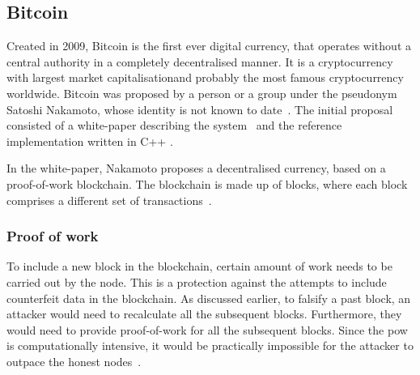 \subsection{Bitcoin}
% 
Created in 2009, Bitcoin is the first ever digital currency, that operates without a central authority in a completely decentralised manner. It is a cryptocurrency with largest market capitalisation\footnotemark and probably the most famous cryptocurrency worldwide.
% 
% 
Bitcoin was proposed by a person or a group under the pseudonym Satoshi Nakamoto, whose identity is not known to date~\cite{Feins2017SatoshiBitcoin}. The initial proposal consisted of a white-paper describing the system~\cite{NakamotoBitcoin:System} and the reference implementation written in  C++ \footnotemark.
% 

In the white-paper, Nakamoto proposes a decentralised currency, based on a proof-of-work blockchain. The blockchain is made up of blocks, where each block comprises a different set of transactions~\cite{Decker2013InformationNetwork, Judmayer2017BlocksMechanisms}.

\subsubsection{Proof of work}
To include a new block in the blockchain, certain amount of work needs to be carried out by the node. This is a protection against the attempts to include counterfeit data in the blockchain. As discussed earlier, to falsify a past block, an attacker would need to recalculate all the subsequent blocks. Furthermore, they would need to provide proof-of-work for all the subsequent blocks. Since the \acrfull{pow} is computationally intensive, it would be practically impossible for the attacker to outpace the honest nodes~\cite{NakamotoBitcoin:System}.

